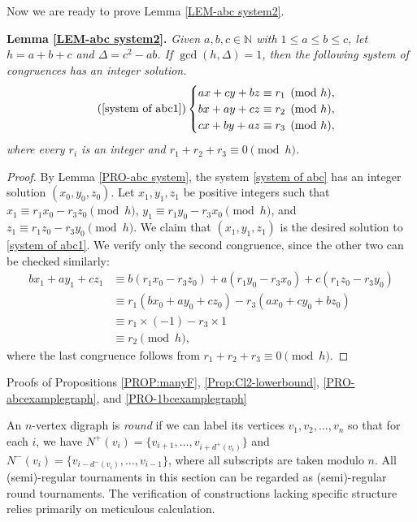 \documentclass[11pt,a4paper,reqno]{amsart}
\makeatletter
\renewcommand\section{\@startsection{section}{1}%
  \z@{-1.0\linespacing\@plus-.7\linespacing}{1\linespacing}%
  {\normalfont\bfseries\large\centering}}
\theoremstyle{definition} %
\makeatother
\begin{document}
Now we are ready to prove Lemma \ref{LEM-abc system2}.

\medskip
\noindent\textbf{Lemma \ref{LEM-abc system2}.}\textit{ Given $a,b,c\in \mathbb{N}$ with $1\leqslant a\leqslant b\leqslant c$, let $h=a+b+c$ and $\Delta=c^2-ab$. If $\gcd(h,\Delta)=1$, then the following system of congruences has an integer solution.
\begin{equation*}\tag{\ref{system of abc1}}\label{eq:A}
\begin{cases}
ax + cy + bz \equiv r_1 \pmod h,\\
bx + ay + cz \equiv r_2 \pmod h,\\
cx + by + az \equiv r_3 \pmod h,
\end{cases}
\end{equation*}
where every $r_i$ is an integer and $r_1+r_2+r_3 \equiv 0\pmod h$.}


\begin{proof} By Lemma \ref{PRO-abc system}, the system \eqref{system of abc} has an integer solution $(x_0,y_0,z_0)$. Let $x_1,y_1,z_1$ be positive integers such that
$x_1\equiv r_1x_0-r_3z_0\pmod h$, $y_1\equiv r_1y_0-r_3x_0\pmod h$, and $z_1\equiv r_1z_0-r_3y_0\pmod h$.
We claim that $(x_1,y_1,z_1)$ is the desired solution to \eqref{system of abc1}. We verify only the second congruence, since the other two can be checked similarly:
\begin{align*}
    bx_1+ay_1+cz_1&\equiv b(r_1x_0-r_3z_0)+a(r_1y_0-r_3x_0)+c(r_1z_0-r_3y_0)\\
    &\equiv r_1(bx_0+ay_0+cz_0)-r_3(ax_0+cy_0+bz_0)\\
    & \equiv r_1\times(-1)-r_3\times 1\\
    &\equiv r_2\pmod h,
\end{align*}
where the last congruence follows from $r_1+r_2+r_3\equiv 0\pmod h$.
\end{proof}







\section{Proofs of Propositions \ref{PROP:manyF},  \ref{Prop:Cl2-lowerbound}, \ref{PRO-abcexamplegraph}, and \ref{PRO-1bcexamplegraph}} \label{APP:B}


  An $n$-vertex digraph is \emph{round} if we can label its vertices $v_1, v_2, \ldots, v_n$ so that for each $i$, we have $N^+(v_i) = \{v_{i+1}, \ldots, v_{i+d^+(v_i)}\}$ and $N^-(v_i) = \{v_{i-d^-(v_i)}, \ldots, v_{i-1}\}$, where all subscripts are taken modulo $n$. All (semi)-regular tournaments in this section can be regarded as (semi)-regular round tournaments. The verification of constructions lacking specific structure relies primarily on meticulous calculation.
\end{document}
